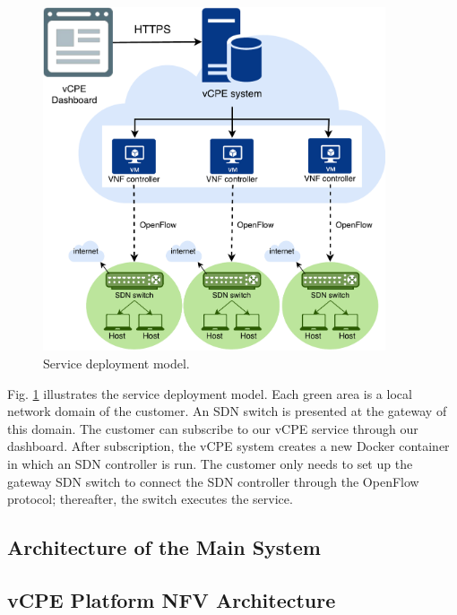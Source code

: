 \begin{figure}[!t]
\centering
\includegraphics[width=0.9\textwidth]{./fig/hsnl_service_deployment}
\caption{Service deployment model.}
\label{fig:hsnl_service_deployment}
\end{figure}

Fig. \ref{fig:hsnl_service_deployment} illustrates the service deployment model. Each green area is a local network domain of the customer. An SDN switch is presented at the gateway of this domain. The customer can subscribe to our vCPE service through our dashboard. After subscription, the vCPE system creates a new Docker container in which an SDN controller is run. The customer only needs to set up the gateway SDN switch to connect the SDN controller through the OpenFlow protocol; thereafter, the switch executes the service.


\subsection{Architecture of the Main System}


\subsection{vCPE Platform NFV Architecture}

